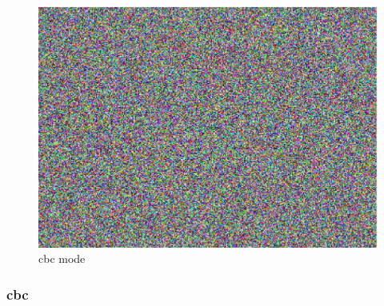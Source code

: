 \begin{minipage}{\linewidth}
\begin{minipage}{0.32\linewidth}
  \end{minipage}
  \begin{minipage}{0.32\linewidth}
       \begin{figure}[H]
	\includegraphics[width=1\linewidth]{figures/CBC-enc.eps}
	\caption{\gls{cbc} mode}
	\label{fig:cbc_picture}
      \end{figure}
  \end{minipage}
\end{minipage}

\subsubsection{\gls{cbc}}


